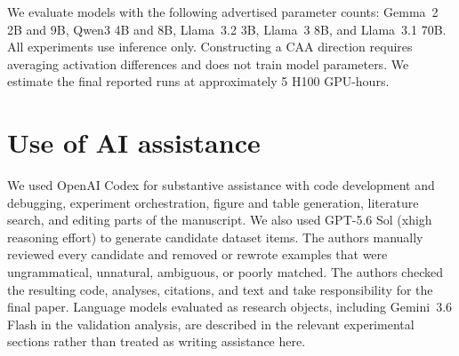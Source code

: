 \documentclass[11pt]{article}
\begin{document}
We evaluate models with the following advertised parameter counts: Gemma~2 2B
and 9B, Qwen3 4B and 8B, Llama~3.2 3B, Llama~3 8B, and Llama~3.1 70B. All
experiments use inference only. Constructing a CAA direction requires averaging
activation differences and does not train model parameters. We estimate the
final reported runs at approximately 5 H100 GPU-hours. 

\section{Use of AI assistance}
\label{app:ai-assistance}

We used OpenAI Codex for substantive assistance with code development and
debugging, experiment orchestration, figure and table generation, literature
search, and editing parts of the manuscript. We also used GPT-5.6 Sol (xhigh reasoning effort) to
generate candidate dataset items. The authors manually reviewed every candidate
and removed or rewrote examples that were ungrammatical, unnatural, ambiguous,
or poorly matched. The authors checked the resulting code, analyses, citations,
and text and take responsibility for the final paper. Language models evaluated
as research objects, including Gemini~3.6 Flash in the validation analysis, are
described in the relevant experimental sections rather than treated as writing
assistance here.

\end{document}
